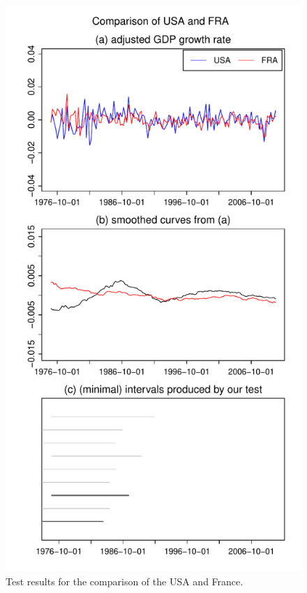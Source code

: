 \documentclass[a4paper,12pt]{article}
\begin{document}
\begin{figure}[p!]
\begin{minipage}[t]{0.49\textwidth}
\includegraphics[width=\textwidth]{Plots/gdp/USA_vs_FRA}
\caption{Test results for the comparison of the USA and France.}\label{fig:USA:France}
\end{minipage}
\hspace{0.25cm}

\end{figure}
\end{document}
